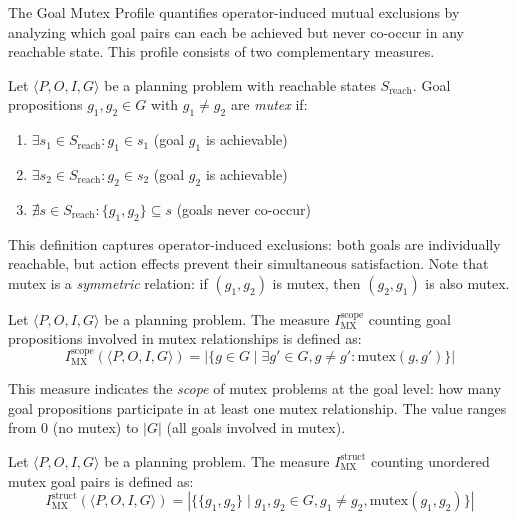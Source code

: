 The Goal Mutex Profile quantifies operator-induced mutual exclusions by analyzing which goal pairs can each be achieved but never co-occur in any reachable state. This profile consists of two complementary measures.

\begin{defn}
    \label{defn:mutex}
    Let $\langle P, O, I, G \rangle$ be a planning problem with reachable states $S_{\text{reach}}$. Goal propositions $g_1, g_2 \in G$ with $g_1 \neq g_2$ are \emph{mutex} if:
    \begin{enumerate}
        \item $\exists s_1 \in S_{\text{reach}} : g_1 \in s_1$ (goal $g_1$ is achievable)
        \item $\exists s_2 \in S_{\text{reach}} : g_2 \in s_2$ (goal $g_2$ is achievable)
        \item $\nexists s \in S_{\text{reach}} : \{g_1, g_2\} \subseteq s$ (goals never co-occur)
    \end{enumerate}
\end{defn}

This definition captures operator-induced exclusions: both goals are individually reachable, but action effects prevent their simultaneous satisfaction. Note that mutex is a \emph{symmetric} relation: if $(g_1, g_2)$ is mutex, then $(g_2, g_1)$ is also mutex.

\begin{defn}
    Let $\langle P, O, I, G \rangle$ be a planning problem. The measure $I^{\text{scope}}_{\text{MX}}$ counting goal propositions involved in mutex relationships is defined as:
    \begin{equation*}
        I^{\text{scope}}_{\text{MX}}(\langle P, O, I, G \rangle) = |\{g \in G \mid \exists g' \in G, g \neq g' : \text{mutex}(g, g')\}|
    \end{equation*}
\end{defn}

This measure indicates the \emph{scope} of mutex problems at the goal level: how many goal propositions participate in at least one mutex relationship. The value ranges from $0$ (no mutex) to $|G|$ (all goals involved in mutex).

\begin{defn}
    Let $\langle P, O, I, G \rangle$ be a planning problem. The measure $I^{\text{struct}}_{\text{MX}}$ counting unordered mutex goal pairs is defined as:
    \begin{equation*}
        I^{\text{struct}}_{\text{MX}}(\langle P, O, I, G \rangle) = |\{\{g_1, g_2\} \mid g_1, g_2 \in G, g_1 \neq g_2, \text{mutex}(g_1, g_2)\}|
    \end{equation*}
\end{defn}


